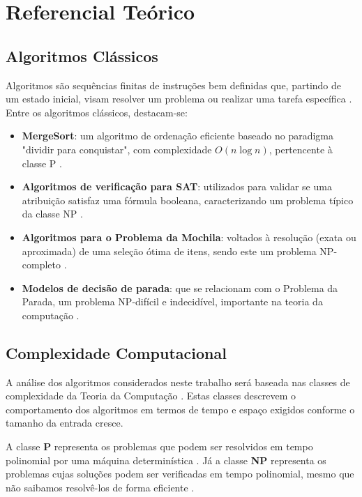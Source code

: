 \documentclass[12pt,oneside,a4paper]{report}
\begin{document}
\chapter{Referencial Teórico}

\section{Algoritmos Clássicos}

Algoritmos são sequências finitas de instruções bem definidas que, partindo de um estado inicial, visam resolver um problema ou realizar uma tarefa específica \cite{cormen2022}. Entre os algoritmos clássicos, destacam-se:

\begin{itemize}
    \item \textbf{MergeSort}: um algoritmo de ordenação eficiente baseado no paradigma "dividir para conquistar", com complexidade \( O(n \log n) \), pertencente à classe P \cite{cormen2022, knuth1998}.
    \item \textbf{Algoritmos de verificação para SAT}: utilizados para validar se uma atribuição satisfaz uma fórmula booleana, caracterizando um problema típico da classe NP \cite{garey1979}.
    \item \textbf{Algoritmos para o Problema da Mochila}: voltados à resolução (exata ou aproximada) de uma seleção ótima de itens, sendo este um problema NP-completo \cite{garey1979}.
    \item \textbf{Modelos de decisão de parada}: que se relacionam com o Problema da Parada, um problema NP-difícil e indecidível, importante na teoria da computação \cite{sipser2012}.
\end{itemize}

\section{Complexidade Computacional}

A análise dos algoritmos considerados neste trabalho será baseada nas classes de complexidade da Teoria da Computação \cite{sipser2012}. Estas classes descrevem o comportamento dos algoritmos em termos de tempo e espaço exigidos conforme o tamanho da entrada cresce.

A classe \textbf{P} representa os problemas que podem ser resolvidos em tempo polinomial por uma máquina determinística \cite{cormen2022}. Já a classe \textbf{NP} representa os problemas cujas soluções podem ser verificadas em tempo polinomial, mesmo que não saibamos resolvê-los de forma eficiente \cite{sipser2012}.
\end{document}
